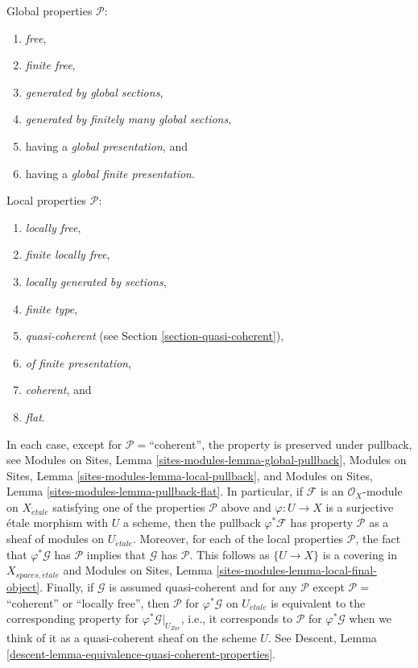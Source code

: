 \medskip\noindent
Global properties $\mathcal{P}$:
\begin{enumerate}
\item {\it free},
\item {\it finite free},
\item {\it generated by global sections},
\item {\it generated by finitely many global sections},
\item having a {\it global presentation}, and
\item having a {\it global finite presentation}.
\end{enumerate}
Local properties $\mathcal{P}$:
\begin{enumerate}
\item {\it locally free},
\item {\it finite locally free},
\item {\it locally generated by sections},
\item {\it finite type},
\item {\it quasi-coherent} (see Section \ref{section-quasi-coherent}),
\item {\it of finite presentation},
\item {\it coherent}, and
\item {\it flat}.
\end{enumerate}
In each case, except for $\mathcal{P}=$``coherent'', the property is preserved
under pullback, see
Modules on Sites, Lemma \ref{sites-modules-lemma-global-pullback},
Modules on Sites, Lemma \ref{sites-modules-lemma-local-pullback}, and
Modules on Sites, Lemma \ref{sites-modules-lemma-pullback-flat}.
In particular, if $\mathcal{F}$ is an $\mathcal{O}_X$-module on
$X_{\acute{e}tale}$ satisfying one of the properties $\mathcal{P}$ above
and $\varphi : U \to X$ is a surjective \'etale
morphism with $U$ a scheme, then the pullback $\varphi^*\mathcal{F}$
has property $\mathcal{P}$ as a sheaf of modules on $U_{\acute{e}tale}$.
Moreover, for each of the local properties $\mathcal{P}$, the fact that
$\varphi^*\mathcal{G}$ has $\mathcal{P}$ implies
that $\mathcal{G}$ has $\mathcal{P}$. This follows as $\{U \to X\}$
is a covering in $X_{spaces, \acute{e}tale}$ and
Modules on Sites, Lemma \ref{sites-modules-lemma-local-final-object}.
Finally, if $\mathcal{G}$ is assumed quasi-coherent and for any
$\mathcal{P}$ except $\mathcal{P}=$``coherent'' or ``locally free'',
then $\mathcal{P}$ for $\varphi^*\mathcal{G}$ on $U_{\acute{e}tale}$ is
equivalent to the corresponding property for
$\varphi^*\mathcal{G}|_{U_{Zar}}$, i.e., it corresponds to $\mathcal{P}$
for $\varphi^*\mathcal{G}$ when we think of it as a quasi-coherent sheaf
on the scheme $U$. See
Descent, Lemma \ref{descent-lemma-equivalence-quasi-coherent-properties}.



